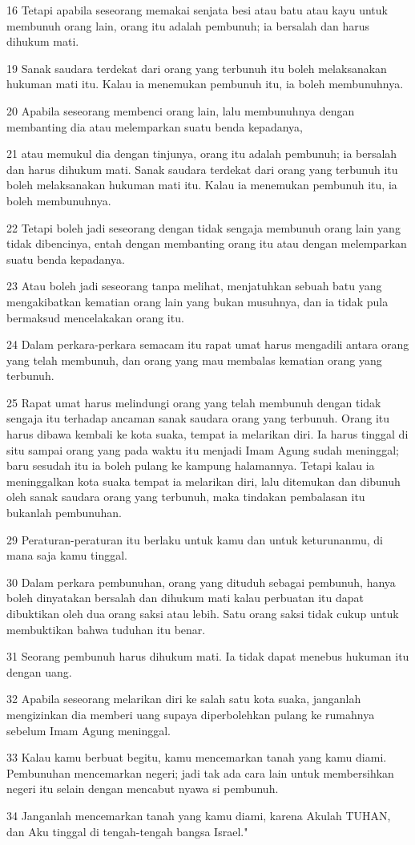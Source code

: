 \par 16 Tetapi apabila seseorang memakai senjata besi atau batu atau kayu untuk membunuh orang lain, orang itu adalah pembunuh; ia bersalah dan harus dihukum mati.
\par 19 Sanak saudara terdekat dari orang yang terbunuh itu boleh melaksanakan hukuman mati itu. Kalau ia menemukan pembunuh itu, ia boleh membunuhnya.
\par 20 Apabila seseorang membenci orang lain, lalu membunuhnya dengan membanting dia atau melemparkan suatu benda kepadanya,
\par 21 atau memukul dia dengan tinjunya, orang itu adalah pembunuh; ia bersalah dan harus dihukum mati. Sanak saudara terdekat dari orang yang terbunuh itu boleh melaksanakan hukuman mati itu. Kalau ia menemukan pembunuh itu, ia boleh membunuhnya.
\par 22 Tetapi boleh jadi seseorang dengan tidak sengaja membunuh orang lain yang tidak dibencinya, entah dengan membanting orang itu atau dengan melemparkan suatu benda kepadanya.
\par 23 Atau boleh jadi seseorang tanpa melihat, menjatuhkan sebuah batu yang mengakibatkan kematian orang lain yang bukan musuhnya, dan ia tidak pula bermaksud mencelakakan orang itu.
\par 24 Dalam perkara-perkara semacam itu rapat umat harus mengadili antara orang yang telah membunuh, dan orang yang mau membalas kematian orang yang terbunuh.
\par 25 Rapat umat harus melindungi orang yang telah membunuh dengan tidak sengaja itu terhadap ancaman sanak saudara orang yang terbunuh. Orang itu harus dibawa kembali ke kota suaka, tempat ia melarikan diri. Ia harus tinggal di situ sampai orang yang pada waktu itu menjadi Imam Agung sudah meninggal; baru sesudah itu ia boleh pulang ke kampung halamannya. Tetapi kalau ia meninggalkan kota suaka tempat ia melarikan diri, lalu ditemukan dan dibunuh oleh sanak saudara orang yang terbunuh, maka tindakan pembalasan itu bukanlah pembunuhan.
\par 29 Peraturan-peraturan itu berlaku untuk kamu dan untuk keturunanmu, di mana saja kamu tinggal.
\par 30 Dalam perkara pembunuhan, orang yang dituduh sebagai pembunuh, hanya boleh dinyatakan bersalah dan dihukum mati kalau perbuatan itu dapat dibuktikan oleh dua orang saksi atau lebih. Satu orang saksi tidak cukup untuk membuktikan bahwa tuduhan itu benar.
\par 31 Seorang pembunuh harus dihukum mati. Ia tidak dapat menebus hukuman itu dengan uang.
\par 32 Apabila seseorang melarikan diri ke salah satu kota suaka, janganlah mengizinkan dia memberi uang supaya diperbolehkan pulang ke rumahnya sebelum Imam Agung meninggal.
\par 33 Kalau kamu berbuat begitu, kamu mencemarkan tanah yang kamu diami. Pembunuhan mencemarkan negeri; jadi tak ada cara lain untuk membersihkan negeri itu selain dengan mencabut nyawa si pembunuh.
\par 34 Janganlah mencemarkan tanah yang kamu diami, karena Akulah TUHAN, dan Aku tinggal di tengah-tengah bangsa Israel."

